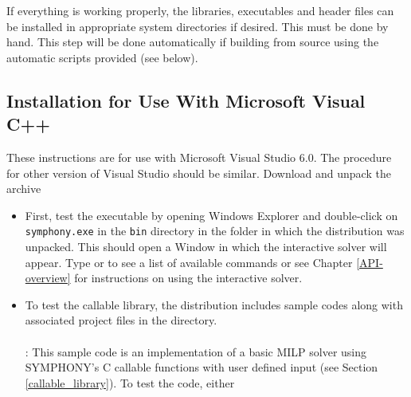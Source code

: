 If everything is working properly, the libraries, executables and header files
can be installed in appropriate system directories if desired. This must be
done by hand. This step will be done automatically if building from source
using the automatic scripts provided (see below).

\subsection{Installation for Use With Microsoft Visual C++}

These instructions are for use with Microsoft Visual Studio 6.0. The procedure
for other version of Visual Studio should be similar. Download and unpack the
archive 
\begin{itemize}
\item First, test the executable by opening Windows Explorer and double-click
on {\color{Brown}\texttt{symphony.exe}} in the {\color{Brown}\texttt{bin}}
directory in the folder in which the distribution was unpacked. This should
open a Window in which the interactive solver will appear. Type 
or  to see a list of available commands or see Chapter
\ref{API-overview} for instructions on using the interactive solver.

\item To test the callable library, the distribution includes sample codes
along with associated project files in the  directory. \\ \\
: This sample code is an implementation of a basic MILP
solver using SYMPHONY's C callable functions with user defined input (see
Section \ref{callable_library}). To test the code, either


\end{itemize}
